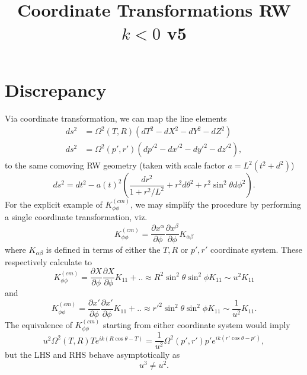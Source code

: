 \documentclass[10pt,letterpaper]{article}
\title{Coordinate Transformations RW $k<0$ v5 }
\date{}
\begin{document}
\maketitle
\noindent 
\section*{Discrepancy}
Via coordinate transformation, we can map the line elements
\begin{align}
ds^2 &= \Omega^2(T,R)(dT^2 - dX^2-dY^2 -dZ^2)\nonumber\\
ds^2 &= \Omega^2(p',r')(dp'^2 - dx'^2-dy'^2 -dz'^2),
\end{align}
to the same comoving RW geometry (taken with scale factor $a=L^2(t^2+d^2)$)
\begin{equation}
ds^2 =  dt^2 - a(t)^2 \left(  \frac{dr^2}{1+r^2/L^2} + r^2 d\theta^2 + r^2\sin^2\theta d\phi^2 \right).
\end{equation}
For the explicit example of $K^{(cm)}_{\phi\phi}$, we may simplify the procedure by performing a single coordinate transformation, viz.
\begin{equation}
K_{\phi\phi}^{(cm)} = \frac{\partial x^\alpha}{\partial \phi}\frac{\partial x^\beta}{\partial \phi}K_{\alpha\beta}
\end{equation}
where $K_{\alpha\beta}$ is defined in terms of either the $T,R$ or $p',r'$ coordinate system. These respectively calculate to
\begin{equation}
K_{\phi\phi}^{(cm)} = \frac{\partial X}{\partial \phi}\frac{\partial X}{\partial \phi}K_{11}+.. \approx R^2 \sin^2\theta \sin^2\phi K_{11} \sim u^2 K_{11}
\end{equation}
and
\begin{equation}
K_{\phi\phi}^{(cm)} = \frac{\partial x'}{\partial \phi}\frac{\partial x'}{\partial \phi}K_{11}+.. \approx r'^2 \sin^2\theta \sin^2\phi K_{11} \sim \frac{1}{u^2} K_{11}.
\end{equation}
The equivalence of $K^{(cm)}_{\phi\phi}$ starting from either coordinate system would imply
\begin{equation}
u^2 \Omega^2(T,R) T  e^{ik(R\cos\theta -T)} = \frac{1}{u^2} \Omega^2(p',r')p' e^{ik(r'\cos\theta - p')},
\end{equation}
but the LHS and RHS behave asymptotically as
\begin{equation}
u^3 \ne u^2.
\end{equation}
\end{document}
